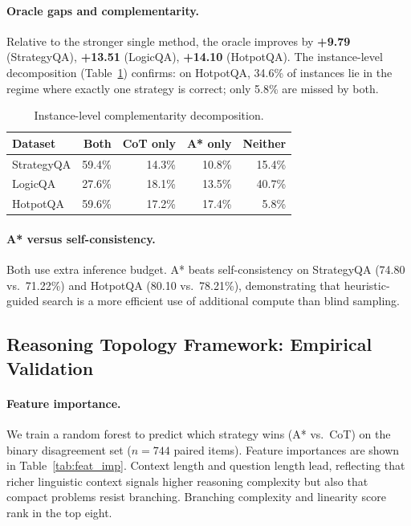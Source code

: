 \documentclass[11pt]{article}
\begin{document}
\paragraph{Oracle gaps and complementarity.}
Relative to the stronger single method, the oracle improves by \textbf{+9.79} (StrategyQA), \textbf{+13.51} (LogicQA), \textbf{+14.10} (HotpotQA). The instance-level decomposition (Table~\ref{tab:decomp}) confirms: on HotpotQA, 34.6\% of instances lie in the regime where exactly one strategy is correct; only 5.8\% are missed by both.

\begin{table}[t]
\centering
\caption{Instance-level complementarity decomposition.}
\label{tab:decomp}
\small
\begin{tabular}{lrrrr}
\toprule
\textbf{Dataset} & \textbf{Both} & \textbf{CoT only} & \textbf{A* only} & \textbf{Neither} \\
\midrule
StrategyQA & 59.4\% & 14.3\% & 10.8\% & 15.4\% \\
LogicQA    & 27.6\% & 18.1\% & 13.5\% & 40.7\% \\
HotpotQA   & 59.6\% & 17.2\% & 17.4\% & 5.8\%  \\
\bottomrule
\end{tabular}
\end{table}

\paragraph{A* versus self-consistency.}
Both use extra inference budget. A* beats self-consistency on StrategyQA (74.80 vs.\ 71.22\%) and HotpotQA (80.10 vs.\ 78.21\%), demonstrating that heuristic-guided search is a more efficient use of additional compute than blind sampling.

\subsection{Reasoning Topology Framework: Empirical Validation}
\label{sec:topology}

\paragraph{Feature importance.}
We train a random forest to predict which strategy wins (A* vs.\ CoT) on the binary disagreement set ($n=744$ paired items). Feature importances are shown in Table~\ref{tab:feat_imp}. Context length and question length lead, reflecting that richer linguistic context signals higher reasoning complexity but also that compact problems resist branching. Branching complexity and linearity score rank in the top eight.
\end{document}
